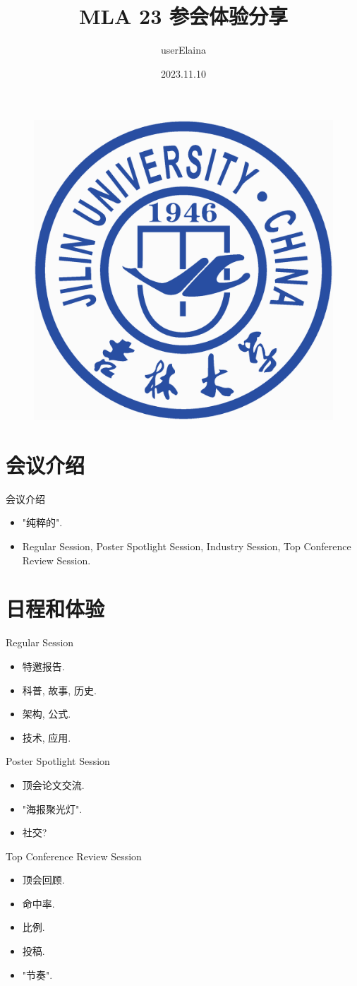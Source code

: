 \documentclass{beamer}
\author{userElaina}
\title{MLA 23 参会体验分享}
\subtitle{}
\institute{人工智能学院}
\date{2023.11.10}
\begin{document}
\kaishu
\begin{frame}
    \titlepage
    \begin{figure}[htpb]
        \begin{center}
            \includegraphics[width=0.15\linewidth]{pic/Jilin_University_Logo.eps}
        \end{center}
    \end{figure}
\end{frame}

\begin{frame}
\tableofcontents[sectionstyle=show,subsectionstyle=show/shaded/hide,subsubsectionstyle=show/shaded/hide]
\end{frame}

\section{会议介绍}

\begin{frame}{会议介绍}
    \begin{itemize}
        \item "纯粹的".
        \item Regular Session, Poster Spotlight Session, Industry Session, Top Conference Review Session.
    \end{itemize}
\end{frame}

\section{日程和体验}

\begin{frame}{Regular Session}
    \begin{itemize}
        \item 特邀报告.
        \item 科普, 故事, 历史.
        \item 架构, 公式.
        \item 技术, 应用.
    \end{itemize}
\end{frame}

\begin{frame}{Poster Spotlight Session}
    \begin{itemize}
        \item 顶会论文交流.
        \item "海报聚光灯".
        \item 社交?
    \end{itemize}
\end{frame}

\begin{frame}{Top Conference Review Session}
    \begin{itemize}
        \item 顶会回顾.
        \item 命中率.
        \item 比例.
        \item 投稿.
        \item "节奏".
    \end{itemize}
\end{frame}
\end{document}
